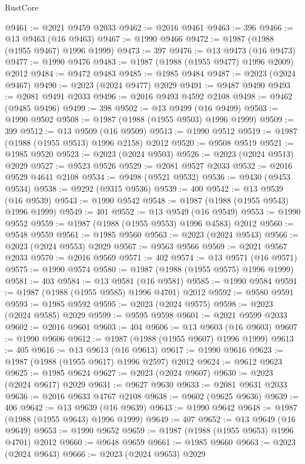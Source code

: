 \begin{lexlean}{RustCore}
\begin{coremodule}
@9461 := @2021 @9459 @2033
@9462 := @2016 @9461
@9463 := 396
@9466 := @13 @9463 (@16 @9463)
@9467 := @1990 @9466
@9472 := @1987 (@1988 (@1955 @9467) @1996 @1999)
@9473 := 397
@9476 := @13 @9473 (@16 @9473)
@9477 := @1990 @9476
@9483 := @1987 (@1988 (@1955 @9477) @1996 @2009) @2012
@9484 := @9472 @9483
@9485 := @1985 @9484
@9487 := @2023 (@2024 @9467)
@9490 := @2023 (@2024 @9477) @2029
@9491 := @9487 @9490
@9493 := @2081 @9491 @2033
@9496 := @2016 @9493 @4592 @2108
@9498 := @9462 (@9485 @9496)
@9499 := 398
@9502 := @13 @9499 (@16 @9499)
@9503 := @1990 @9502
@9508 := @1987 (@1988 (@1955 @9503) @1996 @1999)
@9509 := 399
@9512 := @13 @9509 (@16 @9509)
@9513 := @1990 @9512
@9519 := @1987 (@1988 (@1955 @9513) @1996 @2158) @2012
@9520 := @9508 @9519
@9521 := @1985 @9520
@9523 := @2023 (@2024 @9503)
@9526 := @2023 (@2024 @9513) @2029
@9527 := @9523 @9526
@9529 := @2081 @9527 @2033
@9532 := @2016 @9529 @4641 @2108
@9534 := @9498 (@9521 @9532)
@9536 := @9430 (@9453 @9534)
@9538 := @9292 (@9315 @9536)
@9539 := 400
@9542 := @13 @9539 (@16 @9539)
@9543 := @1990 @9542
@9548 := @1987 (@1988 (@1955 @9543) @1996 @1999)
@9549 := 401
@9552 := @13 @9549 (@16 @9549)
@9553 := @1990 @9552
@9559 := @1987 (@1988 (@1955 @9553) @1996 @4583) @2012
@9560 := @9548 @9559
@9561 := @1985 @9560
@9563 := @2023 (@2024 @9543)
@9566 := @2023 (@2024 @9553) @2029
@9567 := @9563 @9566
@9569 := @2021 @9567 @2033
@9570 := @2016 @9569
@9571 := 402
@9574 := @13 @9571 (@16 @9571)
@9575 := @1990 @9574
@9580 := @1987 (@1988 (@1955 @9575) @1996 @1999)
@9581 := 403
@9584 := @13 @9581 (@16 @9581)
@9585 := @1990 @9584
@9591 := @1987 (@1988 (@1955 @9585) @1996 @4701) @2012
@9592 := @9580 @9591
@9593 := @1985 @9592
@9595 := @2023 (@2024 @9575)
@9598 := @2023 (@2024 @9585) @2029
@9599 := @9595 @9598
@9601 := @2021 @9599 @2033
@9602 := @2016 @9601
@9603 := 404
@9606 := @13 @9603 (@16 @9603)
@9607 := @1990 @9606
@9612 := @1987 (@1988 (@1955 @9607) @1996 @1999)
@9613 := 405
@9616 := @13 @9613 (@16 @9613)
@9617 := @1990 @9616
@9623 := @1987 (@1988 (@1955 @9617) @1996 @2597) @2012
@9624 := @9612 @9623
@9625 := @1985 @9624
@9627 := @2023 (@2024 @9607)
@9630 := @2023 (@2024 @9617) @2029
@9631 := @9627 @9630
@9633 := @2081 @9631 @2033
@9636 := @2016 @9633 @4767 @2108
@9638 := @9602 (@9625 @9636)
@9639 := 406
@9642 := @13 @9639 (@16 @9639)
@9643 := @1990 @9642
@9648 := @1987 (@1988 (@1955 @9643) @1996 @1999)
@9649 := 407
@9652 := @13 @9649 (@16 @9649)
@9653 := @1990 @9652
@9659 := @1987 (@1988 (@1955 @9653) @1996 @4701) @2012
@9660 := @9648 @9659
@9661 := @1985 @9660
@9663 := @2023 (@2024 @9643)
@9666 := @2023 (@2024 @9653) @2029

\end{coremodule}
\end{lexlean}
